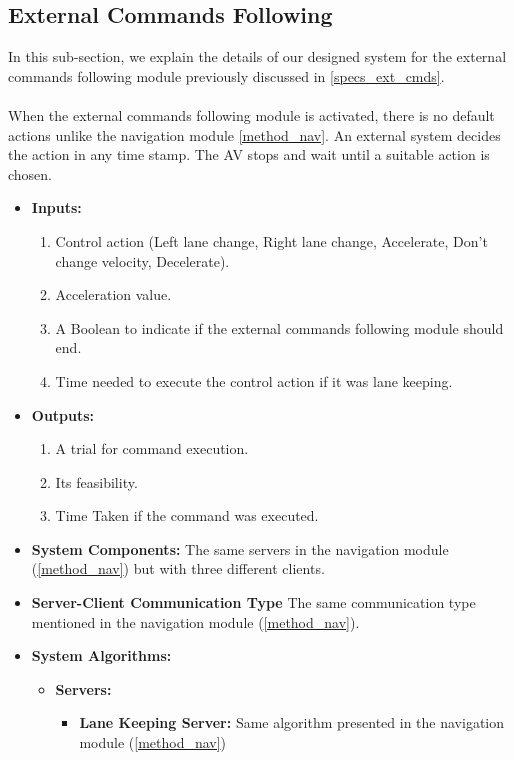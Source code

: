 \subsection{External Commands Following}
\label{method_ext_cmds}
In this sub-section, we explain the details of our designed system for the external commands following module previously discussed in \ref{specs_ext_cmds}. \\ \\
When the external commands following module is activated, there is no default actions unlike the navigation module \ref{method_nav}. An external system decides the action in any time stamp. The AV stops and wait until a suitable action is chosen.
\begin{itemize}
    \item \textbf{Inputs:}
    \begin{enumerate}
        \item Control action (Left lane change, Right lane change, Accelerate, Don't change velocity, Decelerate).
        \item Acceleration value.
        \item A Boolean to indicate if the external commands following module should end.
        \item Time needed to execute the control action if it was lane keeping.
    \end{enumerate}
    \item \textbf{Outputs:} 
    \begin{enumerate}
        \item A trial for command execution.
        \item Its feasibility.
        \item Time Taken if the command was executed. 
    \end{enumerate}
    \item \textbf{System Components:} The same servers in the navigation module (\ref{method_nav}) but with three different clients.
    \item \textbf{Server-Client Communication Type} The same communication type mentioned in the navigation module (\ref{method_nav}).
    \item \textbf{System Algorithms: }
    \begin{itemize}
        \item \textbf{Servers:}
            \begin{itemize}
                \item \textbf{Lane Keeping Server:} Same algorithm presented in the navigation module (\ref{method_nav})

\end{itemize}
\end{itemize}
\end{itemize}
